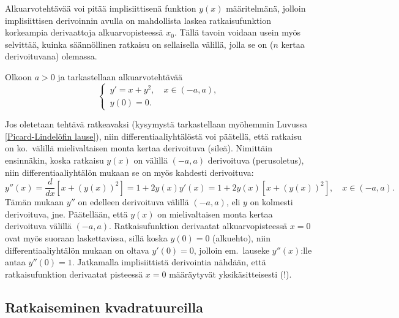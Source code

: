 Alkuarvotehtävää voi pitää implisiittisenä funktion $y(x)$ määritelmänä, jolloin implisiittisen
derivoinnin avulla on mahdollista laskea ratkaisufunktion korkeampia derivaattoja 
alkuarvopisteessä $x_0$. Tällä tavoin voidaan usein myös selvittää, kuinka säännöllinen ratkaisu
on sellaisella välillä, jolla se on ($n$ kertaa derivoituvana) olemassa.
\begin{Exa} \label{Airyn DY} Olkoon $a>0$ ja tarkastellaan alkuarvotehtävää
\[
\begin{cases} \,y'=x+y^2, \quad x\in(-a,a), \\ \,y(0)=0. \end{cases}
\]

Jos oletetaan tehtävä ratkeavaksi (kysymystä tarkastellaan myöhemmin Luvussa 
\ref{Picard-Lindelöfin lause}), niin differentiaaliyhtälöstä voi päätellä, että ratkaisu on 
ko.\ välillä mielivaltaisen monta kertaa derivoituva (sileä). Nimittäin ensinnäkin, koska
ratkaisu $y(x)$ on välillä $(-a,a)$ derivoituva (perusoletus), niin differentiaaliyhtälön
mukaan se on myös kahdesti derivoituva:
\[ 
y''(x) = \frac{d}{dx}[x+(y(x))^2] 
       = 1 + 2y(x)y'(x) = 1+2y(x)[x+(y(x))^2], \quad x \in (-a,a). 
\]
Tämän mukaan $y''$ on edelleen derivoituva välillä $(-a,a)$, eli $y$ on kolmesti derivoituva,
jne. Päätellään, että $y(x)$ on mielivaltaisen monta kertaa derivoituva välillä $(-a,a)$.
Ratkaisufunktion derivaatat alkuarvopisteessä $x=0$ ovat myös suoraan laskettavissa, sillä
koska $y(0)=0$ (alkuehto), niin differentiaaliyhtälön mukaan on oltava $y'(0)=0$, jolloin em.\
lauseke $y''(x)$:lle antaa $y''(0)=1$. Jatkamalla implisiittistä derivointia nähdään, että 
ratkaisufunktion \pain{kaikki} derivaatat pisteessä $x=0$ määräytyvät yksikäsitteisesti (!).
\loppu
\end{Exa}

\subsection{Ratkaiseminen kvadratuureilla}


